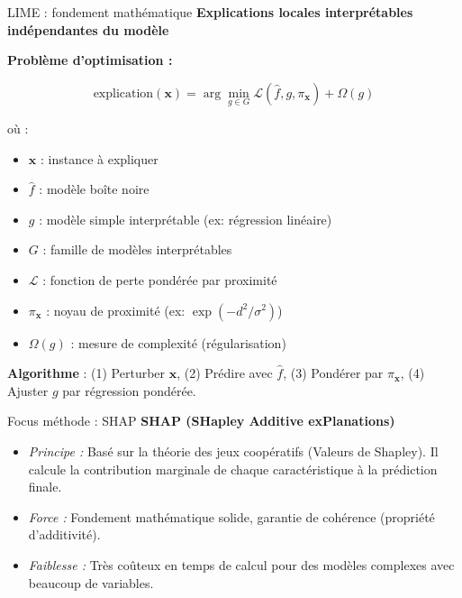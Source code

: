 \documentclass[9pt, aspectratio=169]{beamer}
\begin{document}
\begin{frame}{LIME : fondement mathématique}
    \textbf{Explications locales interprétables indépendantes du modèle}
    
    \vspace{0.3cm}
    \textbf{Problème d'optimisation :}
    
    \[
    \text{explication}(\mathbf{x}) = \arg\min_{g \in G} \mathcal{L}(\hat{f}, g, \pi_{\mathbf{x}}) + \Omega(g)
    \]
    
    \vspace{0.2cm}
    où :
    \begin{itemize}
        \item \(\mathbf{x}\) : instance à expliquer
        \item \(\hat{f}\) : modèle boîte noire
        \item \(g\) : modèle simple interprétable (ex: régression linéaire)
        \item \(G\) : famille de modèles interprétables
        \item \(\mathcal{L}\) : fonction de perte pondérée par proximité
        \item \(\pi_{\mathbf{x}}\) : noyau de proximité (ex: \(\exp(-d^2/\sigma^2)\))
        \item \(\Omega(g)\) : mesure de complexité (régularisation)
    \end{itemize}
    
    \vspace{0.2cm}
    \textbf{Algorithme} : (1) Perturber \(\mathbf{x}\), (2) Prédire avec \(\hat{f}\), (3) Pondérer par \(\pi_{\mathbf{x}}\), (4) Ajuster \(g\) par régression pondérée.
\end{frame}

\begin{frame}{Focus méthode : SHAP}
    \textbf{SHAP (SHapley Additive exPlanations)}
    \begin{itemize}
        \item \textit{Principe :} Basé sur la théorie des jeux coopératifs (Valeurs de Shapley). Il calcule la contribution marginale de chaque caractéristique à la prédiction finale.
        \item \textit{Force :} Fondement mathématique solide, garantie de cohérence (propriété d'additivité).
        \item \textit{Faiblesse :} Très coûteux en temps de calcul pour des modèles complexes avec beaucoup de variables.
    \end{itemize}
\end{frame}
\end{document}
